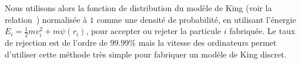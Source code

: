 


			Nous utilisons alors la fonction de distribution du modèle de King (voir la
			relation~) normalisée à $1$ comme une densité de probabilité, en
			utilisant l'énergie $E_i = \frac{1}{2}mv_i^2 + m\psi(r_i)$, pour accepter ou rejeter la
			particule $i$ fabriquée. Le taux de rejection est de l'ordre de $99.99\%$
			mais la vitesse des ordinateurs permet d'utiliser cette méthode très simple pour fabriquer un
			modèle de King discret.

